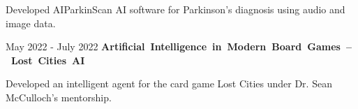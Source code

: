 \documentclass[10pt, letterpaper]{article}
\begin{document}
\vspace{\highlightSpacing}
\begin{onecolentry}
    \begin{highlights}
        \item Developed AIParkinScan AI software for Parkinson's diagnosis using audio and image data.
    \end{highlights}
\end{onecolentry}

\vspace{\entrySpacing}\begin{twocolentry}{May 2022 - July 2022}
    \mbox{\textbf{Artificial Intelligence in Modern Board Games -- Lost Cities AI}}
\end{twocolentry}

\vspace{\highlightSpacing}
\begin{onecolentry}
    \begin{highlights}
        \item Developed an intelligent agent for the card game Lost Cities under Dr. Sean McCulloch's mentorship.
    \end{highlights}
\end{onecolentry}
\end{document}
